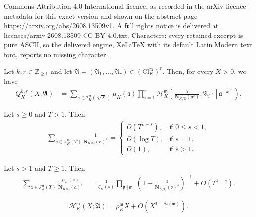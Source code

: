 \documentclass[10pt,a4paper]{amsart}
\newcommand{\Nrm}[2]{\mathbf{N}_{#1}(#2)}
\newcommand{\Q}{\mathbb{Q}}
\newcommand{\Z}{\mathbb{Z}}
\begin{document}
Commons Attribution 4.0 International licence, as recorded in the arXiv licence metadata for this exact version and shown on the abstract page https://arxiv.org/abs/2608.13509v1. A full rights notice is delivered at licenses/arxiv-2608.13509-CC-BY-4.0.txt. Characters: every retained excerpt is pure ASCII, so the delivered engine, XeLaTeX with its default Latin Modern text font, reports no missing character.
\begin{proposition}\label{prop:Q-identity-with-moebius}
Let $k,r\in\Z_{\geq 1}$ and let $\boldsymbol{\mathfrak{A}} = (\mathfrak{A}_1,\dots,\mathfrak{A}_r) \in \left(\mathrm{Cl}_K^{\mathfrak{m}}\right)^r$.
Then, for every $X>0$, we have
\begin{align*}
Q_K^{k,r}(X;\boldsymbol{\mathfrak{A}})
&=
\sum_{\mathfrak{a}\in
\mathcal{I}_K^{\mathfrak{m}}(\sqrt[k]{X})}
\mu_K(\mathfrak{a})
\prod_{i=1}^{r}
\mathcal{H}_K^{\mathfrak{m}}
\left(
\frac{X}{\Nrm{K/\Q}{\mathfrak{a}^k}};
\mathfrak{A}_i\cdot[\mathfrak{a}^{-k}]
\right).
\end{align*}
\end{proposition}

\begin{lemma}\label{lem:several-cases-estimation}
Let $s\geq 0$ and $T > 1$. Then
\begin{align*}
\sum_{\mathfrak{a}\in\mathcal{I}_K^{\mathfrak{m}}(T)}
\frac{1}{\Nrm{K/\Q}{\mathfrak{a}}^s}
=
\begin{cases}
O(T^{1-s}), & \text{if $0\leq s<1$},\\[4pt]
O(\log T), & \text{if $s=1$},\\[4pt]
O(1), & \text{if $s>1$}.
\end{cases}
\end{align*}
\end{lemma}

\begin{lemma}\label{lem:finite-sum-with-moebius-to-dedekind-zeta}
Let $s>1$ and $T\geq 1$. Then
\begin{align*}
\sum_{\mathfrak{a}\in\mathcal{I}_K^{\mathfrak{m}}(T)}
\frac{\mu_K(\mathfrak{a})}
{\Nrm{K/\Q}{\mathfrak{a}}^s}
&=
\frac{1}{\zeta_K(s)}
\prod_{\mathfrak{p}\mid\mathfrak{m}_0}
\left(
1-\frac{1}{\Nrm{K/\Q}{\mathfrak{p}}^s}
\right)^{-1}
+
O(T^{1-s}).
\end{align*}
\end{lemma}

\begin{equation}
\label{eqn:unified-ideal-counting}
\mathcal{H}_K^{\mathfrak{m}}(X;\mathfrak{A})
=
\rho_K^{\mathfrak{m}}X
+
O\left(
X^{1-\delta_d(\mathfrak{m})}
\right).
\end{equation}
\end{document}
